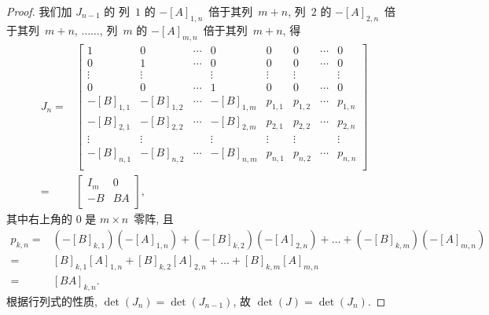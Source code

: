 \documentclass[%
    UTF8,%
    fontset=none,%
    punct=kaiming,%
    zihao=-4,%
    a4paper,%
    oneside,%
]{ctexbook}
\begin{document}
\begin{proof}
    我们加 \(J_{n-1}\) 的%
    列~\(1\) 的 \(-[A]_{1,n}\)~倍于其列~\(m+n\),
    列~\(2\) 的 \(-[A]_{2,n}\)~倍于其列~\(m+n\),
    \(\dots\dots\),
    列~\(m\) 的 \(-[A]_{m,n}\)~倍于其列~\(m+n\),
    得
    \begin{align*}
        J_n
        = {} &
        \begin{bmatrix}
            1          & 0          & \cdots & 0          &
            0          & 0          & \cdots & 0            \\
            0          & 1          & \cdots & 0          &
            0          & 0          & \cdots & 0            \\
            \vdots     & \vdots     & {}     & \vdots     &
            \vdots     & \vdots     & {}     & \vdots       \\
            0          & 0          & \cdots & 1          &
            0          & 0          & \cdots & 0            \\
            -[B]_{1,1} & -[B]_{1,2} & \cdots & -[B]_{1,m} &
            p_{1,1}    & p_{1,2}    & \cdots & p_{1,n}      \\
            -[B]_{2,1} & -[B]_{2,2} & \cdots & -[B]_{2,m} &
            p_{2,1}    & p_{2,2}    & \cdots & p_{2,n}      \\
            \vdots     & \vdots     & {}     & \vdots     &
            \vdots     & \vdots     & {}     & \vdots       \\
            -[B]_{n,1} & -[B]_{n,2} & \cdots & -[B]_{n,m} &
            p_{n,1}    & p_{n,2}    & \cdots & p_{n,n}      \\
        \end{bmatrix}
        \\
        = {} &
        \begin{bmatrix}
            I_m & 0  \\
            -B  & BA \\
        \end{bmatrix},
    \end{align*}
    其中右上角的 \(0\) 是 \(m \times n\)~零阵,
    且
    \begin{align*}
        p_{k,n}
        = {} &
        (-[B]_{k,1})(-[A]_{1,n})
        + (-[B]_{k,2})(-[A]_{2,n})
        + \dots
        + (-[B]_{k,m})(-[A]_{m,n})
        \\
        = {} &
        [B]_{k,1} [A]_{1,n}
        + [B]_{k,2} [A]_{2,n}
        + \dots
        + [B]_{k,m} [A]_{m,n}
        \\
        = {} &
        [BA]_{k,n}.
    \end{align*}
    根据行列式的性质,
    \(\det {(J_n)} = \det {(J_{n-1})}\),
    故
    \(\det {(J)} = \det {(J_n)}\).


\end{proof}
\end{document}
